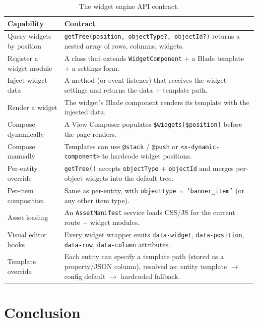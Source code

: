 \documentclass[11pt,a4paper]{article}
\begin{document}
\begin{table}[htbp]
\centering
\caption{The widget engine API contract.}\label{tab:api-contract}
\footnotesize\sloppy
\begin{tabularx}{\columnwidth}{>{\raggedright\arraybackslash}p{4.0cm}X}
\toprule
\textbf{Capability} & \textbf{Contract} \\
\midrule
Query widgets by position & \texttt{getTree(position, objectType?, objectId?)} returns a nested array of rows, columns, widgets. \\
Register a widget module & A class that extends \texttt{WidgetComponent} + a Blade template + a settings form. \\
Inject widget data & A method (or event listener) that receives the widget settings and returns the data + template path. \\
Render a widget & The widget's Blade component renders its template with the injected data. \\
Compose dynamically & A View Composer populates \texttt{\$widgets[\$position]} before the page renders. \\
Compose manually & Templates can use \texttt{@stack} / \texttt{@push} or \texttt{<x-dynamic-component>} to hardcode widget positions. \\
Per-entity override & \texttt{getTree()} accepts \texttt{objectType} + \texttt{objectId} and merges per-object widgets into the default tree. \\
Per-item composition & Same as per-entity, with \texttt{objectType = 'banner\_item'} (or any other item type). \\
Asset loading & An \texttt{AssetManifest} service loads CSS/JS for the current route + widget modules. \\
Visual editor hooks & Every widget wrapper emits \texttt{data-widget}, \texttt{data-position}, \texttt{data-row}, \texttt{data-column} attributes. \\
Template override & Each entity can specify a template path (stored as a property/JSON column), resolved as: entity template $\to$ config default $\to$ hardcoded fallback. \\
\bottomrule
\end{tabularx}
\end{table}

\section{Conclusion}\label{sec:conclusion}
\end{document}
